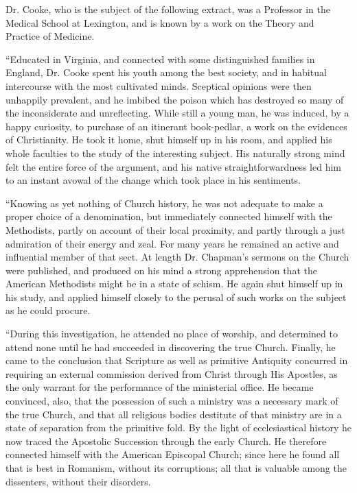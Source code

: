 Dr. Cooke, who is the subject of the following
extract, was a Professor in the Medical School at Lexington, and is
known by a work on the Theory and Practice of Medicine.

``Educated
in Virginia, and connected with some distinguished families in
England, Dr. Cooke spent his youth among the best society, and in
habitual intercourse with the most cultivated minds. Sceptical
opinions were then unhappily prevalent, and he imbibed the poison
which has destroyed so many of the inconsiderate and unreflecting.
While still a young man, he was induced, by a happy curiosity, to
purchase of an itinerant book-pedlar, a work on the evidences of
Christianity. He took it home, shut himself up in his room, and
applied his whole faculties to the study of the interesting subject.
His naturally strong mind felt the entire force of the argument, and
his native straightforwardness led him to an instant avowal of the
change which took place in his sentiments.

``Knowing
as yet nothing of Church history, he was not adequate to make a proper
choice of a denomination, but immediately connected himself with the
Methodists, partly on account of their local proximity, and partly
through a just admiration of their energy and zeal. For many years he
remained an active and influential member of that sect. At length Dr.
Chapman's sermons on the Church were published, and produced on his
mind a strong apprehension that the American Methodists might be in a
state of schism. He again
shut himself up in his study, and applied himself closely to the
perusal of such works on the subject as he could procure.

``During
this investigation, he attended no place of worship, and determined to
attend none until he had succeeded in discovering the true Church.
Finally, he came to the conclusion that Scripture as well as primitive
Antiquity concurred in requiring an external commission derived from
Christ through His Apostles, as the only warrant for the performance
of the ministerial office. He became convinced, also, that the
possession of such a ministry was a necessary mark of the true Church,
and that all religious bodies destitute of that ministry are in a
state of separation from the primitive fold. By the light of
ecclesiastical history he now traced the Apostolic Succession through
the early Church. He therefore connected himself with the American
Episcopal Church; since here he found all that is best in Romanism,
without its corruptions; all that is valuable among the dissenters,
without their disorders.

